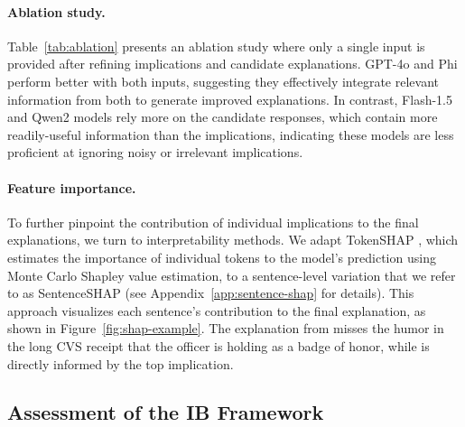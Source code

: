 \paragraph{Ablation study.} Table~\ref{tab:ablation} presents an ablation study where only a single input is provided after refining implications and candidate explanations. GPT-4o and Phi perform better with both inputs, suggesting they effectively integrate relevant information from both to generate improved explanations. In contrast, Flash-1.5 and Qwen2 models rely more on the candidate responses, which contain more readily-useful information than the implications, indicating these models are less proficient at ignoring noisy or irrelevant implications. 

\paragraph{Feature importance.} To further pinpoint the contribution of individual implications to the final explanations, we turn to interpretability methods.  
We adapt TokenSHAP \cite{horovicz-goldshmidt-2024-tokenshap}, which estimates the importance of individual tokens to the model's prediction using Monte Carlo Shapley value estimation, to a sentence-level variation that we refer to as SentenceSHAP (see Appendix~\ref{app:sentence-shap} for details). This approach visualizes each sentence's contribution to the final explanation, as shown in Figure~\ref{fig:shap-example}. The explanation from \base{} misses the humor in the long CVS receipt that the officer is holding as a badge of honor, while \method{} is directly informed by the top implication. 

\subsection{Assessment of the IB Framework} 
\label{sec:results:rq3}
